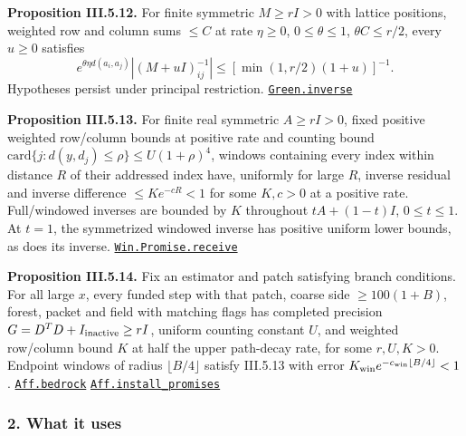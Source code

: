 \documentclass[
  letterpaper,
  11pt]{article}
\begin{document}
\textbf{Proposition III.5.12.} For finite symmetric \(M\ge rI>0\) with
lattice positions, weighted row and column sums \(\le C\) at rate
\(\eta\ge0\), \(0\le\theta\le1\), \(\theta C\le r/2\), every \(u\ge0\)
satisfies
\[e^{\theta\eta d(a_i,a_j)}|(M+uI)^{-1}_{ij}|\le[\min(1,r/2)(1+u)]^{-1}.\]
Hypotheses persist under principal restriction.
\href{https://github.com/yang-mills-group/OpenAI-YM-20261028/blob/3456e5e75cf8d4cd558955a5c7638fba2d68f464/YM/Progress/STATIONARY_SCENES/Green.lean\#L188-L251}{\texttt{Green.inverse}}

\textbf{Proposition III.5.13.} For finite real symmetric \(A\ge rI>0\),
fixed positive weighted row/column bounds at positive rate and counting
bound \(\mathrm{card}\{j:d(y,d_j)\le\rho\}\le U(1+\rho)^4\), windows
containing every index within distance \(R\) of their addressed index
have, uniformly for large \(R\), inverse residual and inverse difference
\(\le Ke^{-cR}<1\) for some \(K,c>0\) at a positive rate. Full/windowed
inverses are bounded by \(K\) throughout \(tA+(1-t)I\), \(0\le t\le1\).
At \(t=1\), the symmetrized windowed inverse has positive uniform lower
bounds, as does its inverse.
\href{https://github.com/yang-mills-group/OpenAI-YM-20261028/blob/3456e5e75cf8d4cd558955a5c7638fba2d68f464/YM/AnalyticNext/CONNECTED_ACTIVITY_BOUNDS/Birthday.lean\#L106-L178}{\texttt{Win.Promise.receive}}

\textbf{Proposition III.5.14.} Fix an estimator and patch satisfying
branch conditions. For all large \(x\), every funded step with that
patch, coarse side \(\ge100(1+B)\), forest, packet and field with
matching flags has completed precision
\(G=D^TD+I_{\rm inactive}\ge rI\), uniform counting constant \(U\), and
weighted row/column bound \(K\) at half the upper path-decay rate, for
some \(r,U,K>0\). Endpoint windows of radius \(\lfloor B/4\rfloor\)
satisfy III.5.13 with error
\(K_{\rm win}e^{-c_{\rm win}\lfloor B/4\rfloor}<1\).
\href{https://github.com/yang-mills-group/OpenAI-YM-20261028/blob/3456e5e75cf8d4cd558955a5c7638fba2d68f464/YM/AnalyticNext/CONNECTED_ACTIVITY_BOUNDS/Bedrock.lean\#L142-L158}{\texttt{Aff.bedrock}}
\href{https://github.com/yang-mills-group/OpenAI-YM-20261028/blob/3456e5e75cf8d4cd558955a5c7638fba2d68f464/YM/AnalyticNext/CONNECTED_ACTIVITY_BOUNDS/Warsaw.lean\#L25-L42}{\texttt{Aff.install\_promises}}

\subsubsection{2. What it uses}\label{what-it-uses-7}
\end{document}
